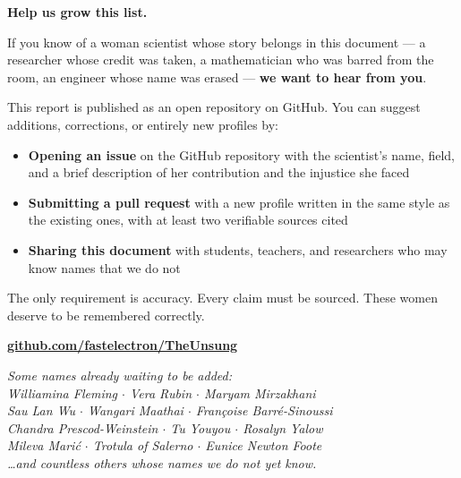 \documentclass[12pt,a4paper]{article}
\begin{document}
\begin{tcolorbox}[factbox, title={Do You Know Someone We Missed?}]

\begin{center}
{\large\color{deepplum}\bfseries Help us grow this list.}
\end{center}

\vspace{6pt}

If you know of a woman scientist whose story belongs in this document --- a researcher whose credit was taken, a mathematician who was barred from the room, an engineer whose name was erased --- \textbf{we want to hear from you}.

\vspace{8pt}

This report is published as an open repository on GitHub. You can suggest additions, corrections, or entirely new profiles by:

\vspace{6pt}

\begin{itemize}[itemsep=5pt]
  \item \textbf{Opening an issue} on the GitHub repository with the scientist's name, field, and a brief description of her contribution and the injustice she faced
  \item \textbf{Submitting a pull request} with a new profile written in the same style as the existing ones, with at least two verifiable sources cited
  \item \textbf{Sharing this document} with students, teachers, and researchers who may know names that we do not
\end{itemize}

\vspace{8pt}

The only requirement is accuracy. Every claim must be sourced. These women deserve to be remembered correctly.

\vspace{10pt}

\begin{center}
{\small\color{steelblue}
\href{https://github.com/fastelectron/TheUnsung}{\textbf{github.com/fastelectron/TheUnsung}}
}
\end{center}

\vspace{4pt}

\begin{center}
{\small\color{medgray}\itshape
Some names already waiting to be added:\\[4pt]
Williamina Fleming $\cdot$ Vera Rubin $\cdot$ Maryam Mirzakhani\\
Sau Lan Wu $\cdot$ Wangari Maathai $\cdot$ Fran\c{c}oise Barr\'{e}-Sinoussi\\
Chandra Prescod-Weinstein $\cdot$ Tu Youyou $\cdot$ Rosalyn Yalow\\
Mileva Mari\'{c} $\cdot$ Trotula of Salerno $\cdot$ Eunice Newton Foote\\[4pt]
\ldots and countless others whose names we do not yet know.
}
\end{center}

\end{tcolorbox}
\end{document}

